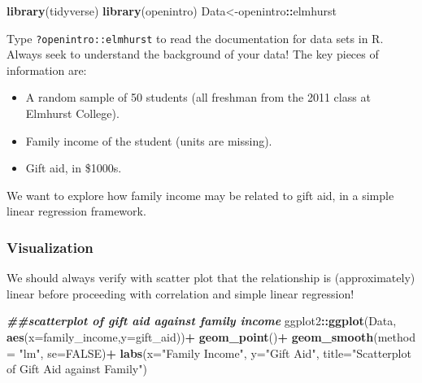 \documentclass[
]{book}
\newenvironment{Shaded}{\begin{snugshade}}{\end{snugshade}}
\newcommand{\AttributeTok}[1]{\textcolor[rgb]{0.13,0.29,0.53}{#1}}
\newcommand{\ConstantTok}[1]{\textcolor[rgb]{0.56,0.35,0.01}{#1}}
\newcommand{\DocumentationTok}[1]{\textcolor[rgb]{0.56,0.35,0.01}{\textbf{\textit{#1}}}}
\newcommand{\FunctionTok}[1]{\textcolor[rgb]{0.13,0.29,0.53}{\textbf{#1}}}
\newcommand{\NormalTok}[1]{#1}
\newcommand{\OtherTok}[1]{\textcolor[rgb]{0.56,0.35,0.01}{#1}}
\newcommand{\SpecialCharTok}[1]{\textcolor[rgb]{0.81,0.36,0.00}{\textbf{#1}}}
\newcommand{\StringTok}[1]{\textcolor[rgb]{0.31,0.60,0.02}{#1}}
\providecommand{\tightlist}{%
  \setlength{\itemsep}{0pt}\setlength{\parskip}{0pt}}
\begin{document}
\begin{Shaded}
\begin{Highlighting}[]
\FunctionTok{library}\NormalTok{(tidyverse)}
\FunctionTok{library}\NormalTok{(openintro)}
\NormalTok{Data}\OtherTok{\textless{}{-}}\NormalTok{openintro}\SpecialCharTok{::}\NormalTok{elmhurst}
\end{Highlighting}
\end{Shaded}

Type \texttt{?openintro::elmhurst} to read the documentation for data sets in R. Always seek to understand the background of your data! The key pieces of information are:

\begin{itemize}
\tightlist
\item
  A random sample of 50 students (all freshman from the 2011 class at Elmhurst College).
\item
  Family income of the student (units are missing).
\item
  Gift aid, in \$1000s.
\end{itemize}

We want to explore how family income may be related to gift aid, in a simple linear regression framework.

\hypertarget{visualization}{%
\subsubsection*{Visualization}\label{visualization}}

We should always verify with scatter plot that the relationship is (approximately) linear before proceeding with correlation and simple linear regression!

\begin{Shaded}
\begin{Highlighting}[]
\DocumentationTok{\#\#scatterplot of gift aid against family income}
\NormalTok{ggplot2}\SpecialCharTok{::}\FunctionTok{ggplot}\NormalTok{(Data, }\FunctionTok{aes}\NormalTok{(}\AttributeTok{x=}\NormalTok{family\_income,}\AttributeTok{y=}\NormalTok{gift\_aid))}\SpecialCharTok{+}
  \FunctionTok{geom\_point}\NormalTok{()}\SpecialCharTok{+}
  \FunctionTok{geom\_smooth}\NormalTok{(}\AttributeTok{method =} \StringTok{"lm"}\NormalTok{, }\AttributeTok{se=}\ConstantTok{FALSE}\NormalTok{)}\SpecialCharTok{+}
  \FunctionTok{labs}\NormalTok{(}\AttributeTok{x=}\StringTok{"Family Income"}\NormalTok{, }\AttributeTok{y=}\StringTok{"Gift Aid"}\NormalTok{, }\AttributeTok{title=}\StringTok{"Scatterplot of Gift Aid against Family"}\NormalTok{)}
\end{Highlighting}
\end{Shaded}
\end{document}
